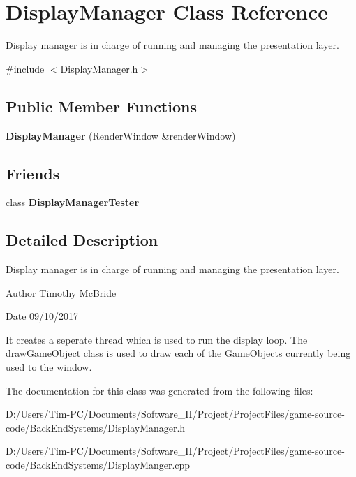 \hypertarget{class_display_manager}{}\section{Display\+Manager Class Reference}
\label{class_display_manager}


Display manager is in charge of running and managing the presentation layer.  




{\ttfamily \#include $<$Display\+Manager.\+h$>$}

\subsection*{Public Member Functions}
\begin{DoxyCompactItemize}
\item 
\mbox{\label{class_display_manager_a5cae0a0f81cbd2457eca8d35733a0516}} 
{\bfseries Display\+Manager} (Render\+Window \&render\+Window)
\end{DoxyCompactItemize}
\subsection*{Friends}
\begin{DoxyCompactItemize}
\item 
\mbox{\label{class_display_manager_a34f8fb8dbcfaa7c498563849f0b88aeb}} 
class {\bfseries Display\+Manager\+Tester}
\end{DoxyCompactItemize}


\subsection{Detailed Description}
Display manager is in charge of running and managing the presentation layer. 

\begin{DoxyAuthor}{Author}
Timothy Mc\+Bride 
\end{DoxyAuthor}
\begin{DoxyDate}{Date}
09/10/2017
\end{DoxyDate}
It creates a seperate thread which is used to run the display loop. The draw\+Game\+Object class is used to draw each of the \hyperlink{class_game_object}{Game\+Object}\textquotesingle{}s currently being used to the window. 

The documentation for this class was generated from the following files\+:\begin{DoxyCompactItemize}
\item 
D\+:/\+Users/\+Tim-\/\+P\+C/\+Documents/\+Software\+\_\+\+I\+I/\+Project/\+Project\+Files/game-\/source-\/code/\+Back\+End\+Systems/Display\+Manager.\+h\item 
D\+:/\+Users/\+Tim-\/\+P\+C/\+Documents/\+Software\+\_\+\+I\+I/\+Project/\+Project\+Files/game-\/source-\/code/\+Back\+End\+Systems/Display\+Manger.\+cpp\end{DoxyCompactItemize}
